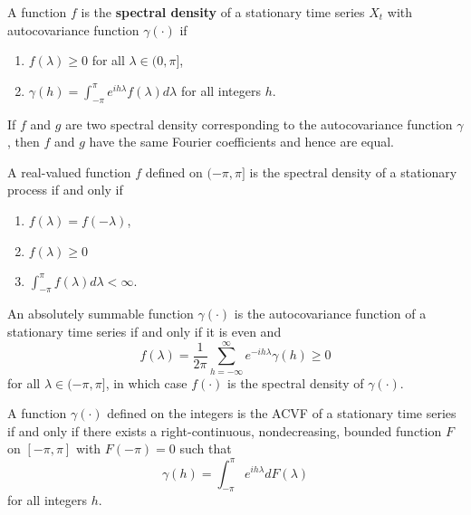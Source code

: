 \begin{defn}
  \label{defn:spectral_analysis:3}
  A function $f$ is the \textbf{spectral density} of a stationary time
  series $X_{t}$ with autocovariance function $\gamma(\cdot)$ if
  \begin{enumerate}
  \item $f(\lambda) \geq 0$ for all $\lambda \in (0, \pi]$,
  \item $\gamma(h) = \int_{-\pi}^{\pi} e^{ih\lambda} f(\lambda)
    d\lambda$ for all integers $h$.
  \end{enumerate}
\end{defn}

\begin{lem}
  If $f$ and $g$ are two spectral density corresponding to the
  autocovariance function $\gamma$, then $f$ and $g$ have the same
  Fourier coefficients and hence are equal.
\end{lem}

\begin{thm}
  \label{defn:spectral_analysis:4}
  A real-valued function $f$ defined on $(-\pi, \pi]$ is the spectral
  density of a stationary process if and only if
  \begin{enumerate}
  \item $f(\lambda) = f(-\lambda)$,
  \item $f(\lambda) \geq 0$
  \item $\int_{-\pi}^{\pi} f(\lambda) d\lambda < \infty$.
  \end{enumerate}
\end{thm}

\begin{thm}
  \label{defn:spectral_analysis:5}
  An absolutely summable function $\gamma(\cdot)$ is the
  autocovariance function of a stationary time series if and only if
  it is even and
  \begin{equation}
    \label{eq:70}
    f(\lambda) = \frac{1}{2 \pi} \sum_{h=-\infty}^{\infty}
    e^{-ih\lambda} \gamma(h) \geq 0
  \end{equation} for all $\lambda \in (-\pi, \pi]$, in which case
  $f(\cdot)$ is the spectral density of $\gamma(\cdot)$.
\end{thm}

\begin{thm}
  \label{defn:spectral_analysis:6}
  A function $\gamma(\cdot)$ defined on the integers is the ACVF of a
  stationary time series if and only if there exists a
  right-continuous, nondecreasing, bounded function $F$ on $[-\pi,
  \pi]$ with $F(-\pi) = 0$ such that
  \begin{equation}
    \label{eq:72}
    \gamma(h) = \int_{-\pi}^{\pi} e^{ih\lambda} dF(\lambda)
  \end{equation} for all integers $h$.
\end{thm}

